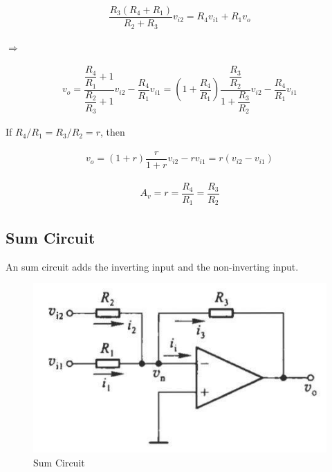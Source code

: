 \begin{equation*}
  \begin{aligned}
    \dfrac{R_3 \left( R_4 + R_1 \right)}{R_2 + R_3} v_{i2} = R_4 v_{i1} + R_1 v_o
  \end{aligned}
\end{equation*}

$\Rightarrow$

\begin{equation*}
  \begin{aligned}
    v_o = \dfrac{\dfrac{R_4}{R_1} + 1 }{\dfrac{R_2}{R_3} + 1 } v_{i2} - \dfrac{R_4}{R_1} v_{i1}  = \left( 1 + \dfrac{R_4}{R_1}  \right) \dfrac{\dfrac{R_3}{R_2} }{1 + \dfrac{R_3}{R_2} } v_{i2} - \dfrac{R_4}{R_1} v_{i1} 
  \end{aligned}
\end{equation*}

If $R_4 / R_1 = R_3 / R_2 = r$, then

\begin{equation*}
  \begin{aligned}
    v_o = \left( 1 + r \right) \dfrac{r}{1 + r} v_{i2} - r v_{i1} = r \left( v_{i2} - v_{i1} \right) 
  \end{aligned}
\end{equation*}

\begin{equation*}
  \begin{aligned}
    A_v = r = \dfrac{R_4}{R_1} = \dfrac{R_3}{R_2}  
  \end{aligned}
\end{equation*}

\subsection{Sum Circuit}

An sum circuit adds the inverting input and the non-inverting input.

\begin{figure}[H]
  \centering
  \includegraphics[width=0.6\linewidth]{figures/sum-amplifier}
  \caption{Sum Circuit}
\end{figure}

